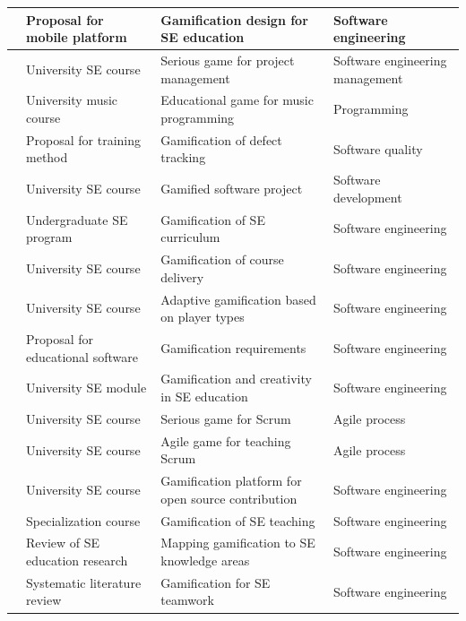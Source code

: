 \documentclass[
	hf,
	]{ceurart}
\begin{document}
\begin{table}[h!]
{\begin{tabular}{|p{3.0cm}|p{4.0cm}|p{4.3cm}|p{4.2cm}|}
				\citet{Huh2016} & Proposal for mobile platform & Gamification design for SE education & Software engineering\\
				\hline
				\citet{Calderon2016} & University SE course & Serious game for project management & Software engineering management\\
				\hline
				\citet{Gomes2014} & University music course & Educational game for music programming & Programming\\
				\hline
				\citet{Gasca-Hurtado2016} & Proposal for training method & Gamification of defect tracking & Software quality\\
				\hline 
				\citet{Buisman2014} & University SE course & Gamified software project & Software development\\
				\hline
				\citet{Qu2014} & Undergraduate SE program & Gamification of SE curriculum & Software engineering\\ 
				\hline
				\citet{Laskowski2015} & University SE course & Gamification of course delivery & Software engineering\\
				\hline 
				\citet{Berkling2015} & University SE course & Adaptive gamification based on player types & Software engineering\\ 
				\hline
				\citet{Peixoto2015} & Proposal for educational software & Gamification requirements & Software engineering\\
				\hline 
				\citet{McCrindle2013} & University SE module & Gamification and creativity in SE education & Software engineering\\
				\hline
				\citet{Schafer2017} & University SE course & Serious game for Scrum & Agile process\\
				\hline 
				\citet{Hof2017} & University SE course & Agile game for teaching Scrum & Agile process\\
				\hline
				\citet{Diniz2017} & University SE course & Gamification platform for open source contribution & Software engineering\\
				\hline 
				\citet{DeSousaPinto2017} & Specialization course & Gamification of SE teaching & Software engineering\\  
				\hline
				\citet{Souza2017} & Review of SE education research & Mapping gamification to SE knowledge areas & Software engineering\\
				\hline
				\citet{Hernandez2017} & Systematic literature review & Gamification for SE teamwork & Software engineering\\
				\hline  
			\end{tabular}
		}
		\end{table}
		
\end{document}

